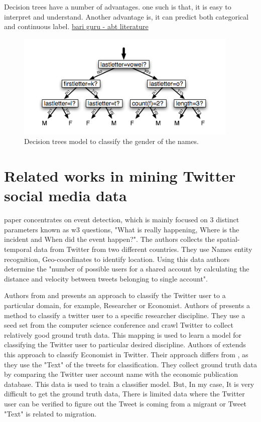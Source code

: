 Decision trees have a number of advantages. one such is that, it is easy to interpret and understand. Another advantage is, it can predict both categorical and continuous label. \underline{bari guru - abt literature }



\begin{figure}
	\centering
	\includegraphics[width=0.5\linewidth]{images/Decisiontrees.png}
	\caption{Decision trees model to classify the gender of the names.}
	\label{fig:Decision_tree}
\end{figure}

\section{Related works in mining Twitter social media data}




\cite{Goergen} paper concentrates on event detection, which is mainly focused on 3 distinct parameters
known as w3 questions, "What is really happening, Where is the incident and When did the
event happen?". The authors collects the spatial-temporal data from Twitter from two different
countries. They use Names entity recognition, Geo-coordinates to identify location. Using this
data authors determine the "number of possible users for a shared account by calculating the
distance and velocity between tweets belonging to single account".

 
Authors from \cite{Hadgu} and  \cite{Böhm2017} presents an approach to classify the Twitter user to a particular domain, for example, Researcher or Economist. Authors of \cite{Hadgu} presents a method to classify a twitter user to a specific researcher discipline. They use a seed set from the computer science conference and crawl Twitter to collect relatively good ground truth data. This mapping is used to learn a model for classifying the Twitter user to particular desired discipline. Authors of \cite{Böhm2017}  extends this approach to classify Economist in Twitter. Their approach differs from \cite{Hadgu}, as they use the "Text" of the tweets for classification. They collect ground truth data by comparing the Twitter user account name with the economic publication database. This data is used to train a classifier model. But, In my case, It is very difficult to get the ground truth data, There is limited data where the Twitter user can be verified to figure out the Tweet is coming from a migrant or Tweet "Text" is related to migration. 
 
